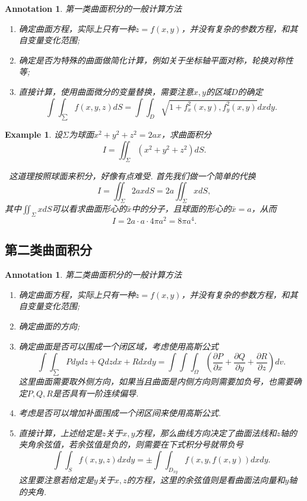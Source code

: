 \documentclass{article}
\newtheorem{example}[theorem]{Example}
\newtheorem{annotation}[theorem]{Annotation}
\newcommand{\hints}{{\color{blue} \text{hints}}}
\begin{document}
\begin{annotation}
\rm 第一类曲面积分的一般计算方法
\begin{enumerate}
	\item 确定曲面方程，实际上只有一种$z=f(x,y)$，并没有复杂的参数方程，和其自变量变化范围; 
	\item 确定是否为特殊的曲面做简化计算，例如关于坐标轴平面对称，轮换对称性等;
	\item 直接计算，使用曲面微分的变量替换，需要注意$x,y$的区域$D$的确定
	$$
\int\int_\sum f(x,y,z)dS = \int\int_D\sqrt{1+f_x^2(x,y),f_y^2(x,y)}dxdy.
$$
\end{enumerate}
\end{annotation}

\begin{example}
\rm 设$\Sigma$为球面$x^2 + y^2 + z^2 = 2ax$，求曲面积分
$$
I =\iint_{\Sigma} (x^2 + y^2 + z^2)dS.
$$

\hints\ 这道理按照球面来积分，好像有点难受. 首先我们做一个简单的代换
$$
I = \iint_{\Sigma} 2ax dS = 2a \iint_{\Sigma} xdS,
$$
其中$\iint_{\Sigma} xdS$可以看求曲面形心的$\bar{x}$中的分子，且球面的形心的$\bar{x} = a$，从而
$$
I = 2a \cdot a \cdot 4\pi a^2 = 8\pi a^4. 
$$
\end{example}

\subsection{第二类曲面积分}

\begin{annotation}
\rm 第二类曲面积分的一般计算方法
\begin{enumerate}
	\item 确定曲面方程，实际上只有一种$z=f(x,y)$，并没有复杂的参数方程，和其自变量变化范围; 
	\item 确定曲面的方向;
	\item 确定曲面是否可以围成一个闭区域，考虑使用高斯公式
	$$
	\int\int_\sum Pdydz + Qdzdx + Rdxdy = \int\int\int_\Omega (\frac{\partial P}{\partial x}+\frac{\partial Q}{\partial y}+\frac{\partial R}{\partial z})dv.
	$$
	这里曲面需要取外侧方向，如果当且曲面是内侧方向则需要加负号，也需要确定$P,Q,R$是否具有一阶连续偏导. 
	\item 考虑是否可以增加补面围成一个闭区间来使用高斯公式. 
	\item 直接计算，上述给定是$z$关于$x,y$方程，那么曲线方向决定了曲面法线和$z$轴的夹角余弦值，若余弦值是负的，则需要在下式积分号就带负号
	$$
	\int\int_{S} f(x,y,z)dxdy = \pm \int\int_{D_{xy}} f(x,y,f(x,y))dxdy.
	$$
	这里要注意若给定是$y$关于$x,z$的方程，这里的余弦值则是看曲面法向量和$y$轴的夹角. 
\end{enumerate}
\end{annotation}
\end{document}
